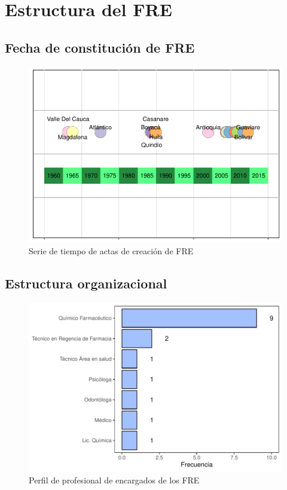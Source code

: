 \documentclass[
]{book}
\begin{document}
\hypertarget{estructura-del-fre}{%
\chapter{Estructura del FRE}\label{estructura-del-fre}}


\hypertarget{fecha-de-constituciuxf3n-de-fre}{%
\section{Fecha de constitución de FRE}\label{fecha-de-constituciuxf3n-de-fre}}

\begin{figure}
\includegraphics[width=0.9\linewidth]{InformeFinal_files/figure-latex/serieTiempoCreacion-1} \caption{Serie de tiempo de actas de creación de FRE}\label{fig:serieTiempoCreacion}
\end{figure}

\hypertarget{estructura-organizacional}{%
\section{Estructura organizacional}\label{estructura-organizacional}}

\begin{figure}
\includegraphics[width=0.85\linewidth]{InformeFinal_files/figure-latex/perfilProfesionalEncargado-1} \caption{Perfil de profesional de encargados de los FRE}\label{fig:perfilProfesionalEncargado}
\end{figure}
\end{document}
